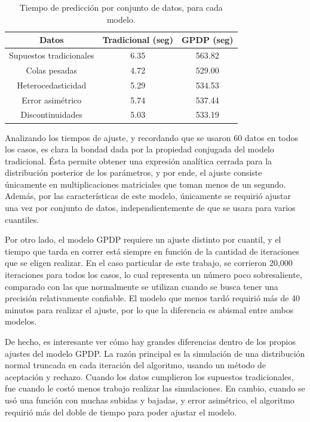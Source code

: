 \begin{table}[H]
\centering
\caption{Tiempo de predicción por conjunto de datos, para cada modelo.} 
\begin{tabular}{ccc}
  \hline
Datos & Tradicional (seg) & GPDP (seg) \\ 
  \hline
Supuestos tradicionales & 6.35 & 563.82 \\ 
  Colas pesadas & 4.72 & 529.00 \\ 
  Heterocedasticidad & 5.29 & 534.53 \\ 
  Error asimétrico & 5.74 & 537.44 \\ 
  Discontinuidades & 5.03 & 533.19 \\ 
   \hline
\end{tabular}
\label{pred_time}
\end{table}

Analizando los tiempos de ajuste, y recordando que se usaron 60 datos en todos los casos, es clara la bondad dada por la propiedad conjugada del modelo tradicional. \'Esta permite obtener una expresi\'on anal\'itica cerrada para la distribuci\'on posterior de los par\'ametros, y por ende, el ajuste consiste \'unicamente en multiplicaciones matriciales que toman menos de un segundo. Adem\'as, por las caracter\'isticas de este modelo, \'unicamente se requiri\'o ajustar una vez por conjunto de datos, independientemente de que se usara para varios cuantiles.

Por otro lado, el modelo GPDP requiere un ajuste distinto por cuantil, y el tiempo que tarda en correr est\'a siempre en funci\'on de la cantidad de iteraciones que se eligen realizar. En el caso particular de este trabajo, se corrieron 20,000 iteraciones para todos los casos, lo cual representa un n\'umero poco sobresaliente, comparado con las que normalmente se utilizan cuando se busca tener una precisi\'on relativamente confiable. El modelo que menos tard\'o requiri\'o m\'as de 40 minutos para realizar el ajuste, por lo que la diferencia es abismal entre ambos modelos.

De hecho, es interesante ver c\'omo hay grandes diferencias dentro de los propios ajustes del modelo GPDP. La raz\'on principal es la simulaci\'on de una distribuci\'on normal truncada en cada iteraci\'on del algoritmo, usando un m\'etodo de aceptaci\'on y rechazo. Cuando los datos cumplieron los supuestos tradicionales, fue cuando le cost\'o menos trabajo realizar las simulaciones. En cambio, cuando se us\'o una funci\'on con muchas subidas y bajadas, y error asim\'etrico, el algoritmo requiri\'o m\'as del doble de tiempo para poder ajustar el modelo.

